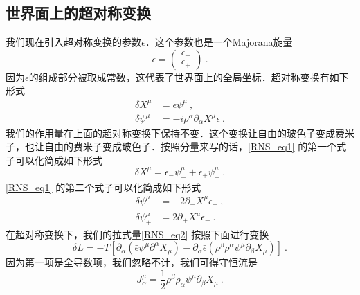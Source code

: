 \subsection{世界面上的超对称变换}
我们现在引入超对称变换的参数$\epsilon$．这个参数也是一个Majorana旋量
\begin{equation}
\epsilon = \begin{pmatrix}
\epsilon_- \\
\epsilon_+
\end{pmatrix}~.
\end{equation}
因为$\epsilon$的组成部分被取成常数，这代表了世界面上的全局坐标．超对称变换有如下形式
\begin{equation}\label{RNS_eq1}
\begin{aligned}
\delta X^\mu & = \bar \epsilon \psi^\mu ~, \\
\delta \psi^\mu & = - i \rho^\alpha \partial_\alpha X^\mu \epsilon ~.   
\end{aligned}
\end{equation}
我们的作用量在上面的超对称变换下保持不变．这个变换让自由的玻色子变成费米子，也让自由的费米子变成玻色子．按照分量来写的话，\autoref{RNS_eq1} 的第一个式子可以化简成如下形式
\begin{equation}
\delta X^\mu = \epsilon_- \psi_-^\mu + \epsilon_+ \psi_+^\mu~.
\end{equation}
\autoref{RNS_eq1} 的第二个式子可以化简成如下形式
\begin{equation}
\begin{aligned}
\delta \psi_-^\mu & = -2\partial_-X^\mu \epsilon_+ ~, \\
\delta \psi_+^\mu & = 2 \partial_+ X^\mu \epsilon_-~.
\end{aligned}
\end{equation}
在超对称变换下，我们的拉式量\autoref{RNS_eq2} 按照下面进行变换
\begin{equation}
\delta L = -T[ \partial_\alpha (\bar\epsilon\psi^\mu\partial^\alpha X_\mu) - \partial_\alpha \bar\epsilon (\rho^\beta\rho^\alpha\psi^\mu\partial_\beta X_\mu) ] ~.
\end{equation}
因为第一项是全导数项，我们忽略不计，我们可得守恒流是
\begin{equation}
J^\mu_\alpha = \frac{1}{2} \rho^\beta \rho_\alpha \psi^\mu \partial_\beta X_\mu ~.
\end{equation}

